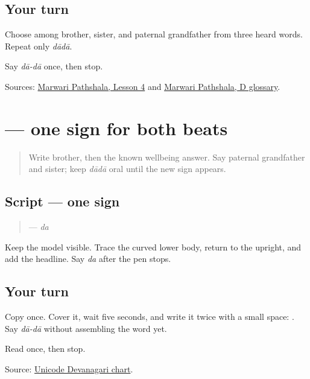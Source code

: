 \subsection*{Your turn}
Choose among brother, sister, and paternal grandfather from three heard words. Repeat only \emph{dādā}.

\begin{tcolorbox}[breakable,colback=teal!4,colframe=teal!35!black,title={Before you move on}]
Say \emph{dā-dā} once, then stop.

Sources: \href{https://www.marwaripathshala.com/marwari-lesson-4-english}{Marwari Pathshala, Lesson 4} and \href{https://www.marwaripathshala.com/d-glossary-of-rajasthani-language}{Marwari Pathshala, D glossary}.
\end{tcolorbox}
\section[\texorpdfstring{\mw{द} (da)}{द (da)}]{ — one sign for both beats}

\label{lesson:MW-W08-da}



\begin{quote}
Write brother, then the known wellbeing answer. Say paternal grandfather and sister; keep \emph{dādā} oral until the new sign appears.
\end{quote}

\subsection*{Script — one sign}

\begin{quote}
\textbf{} — \emph{da}
\end{quote}

Keep the model visible. Trace the curved lower body, return to the upright, and add the headline. Say \emph{da} after the pen stops.

\subsection*{Your turn}
Copy \textbf{} once. Cover it, wait five seconds, and write it twice with a small space: \textbf{ }. Say \emph{dā-dā} without assembling the word yet.

\begin{tcolorbox}[breakable,colback=teal!4,colframe=teal!35!black,title={Before you move on}]
Read \textbf{} once, then stop.

Source: \href{https://www.unicode.org/charts/PDF/U0900.pdf}{Unicode Devanagari chart}.
\end{tcolorbox}
